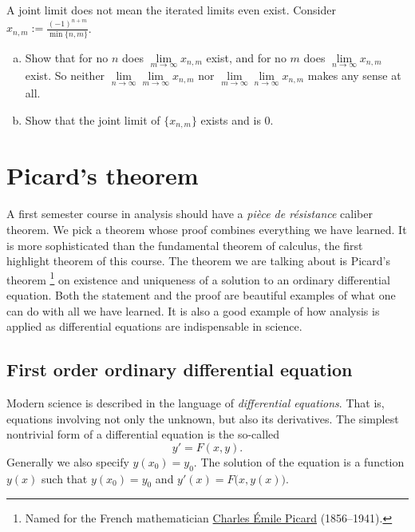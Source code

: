 \documentclass[12pt]{book}
\begin{document}
\begin{exercise}
A joint limit does not mean the iterated limits even exist.
Consider $x_{n,m} := \frac{{(-1)}^{n+m}}{\min \{n,m \}}$.
\begin{enumerate}[a)]
 \item Show that for no $n$ does
$\lim\limits_{m \to \infty} x_{n,m}$ exist, and for no $m$
does 
$\lim\limits_{n \to \infty} x_{n,m}$ exist.
So neither
$\lim\limits_{n\to\infty}\lim\limits_{m \to \infty} x_{n,m}$ nor
$\lim\limits_{m\to\infty}\lim\limits_{n \to \infty} x_{n,m}$ makes any sense
at all.
 \item Show that the joint limit of $\{ x_{n,m} \}$ exists and is 0.
\end{enumerate}
\end{exercise}


\sectionnewpage
\section{Picard's theorem}
\label{sec:picard}


A first semester course in analysis should have
a \emph{pi\`ece de r\'esistance} caliber
theorem.
We pick a theorem whose proof combines everything we have
learned.
It is more sophisticated than the fundamental theorem of calculus,
the first highlight theorem of this course.
The
theorem we are talking about is Picard's
theorem%
\footnote{Named for the French mathematician
\href{http://en.wikipedia.org/wiki/\%C3\%89mile_Picard}{Charles \'Emile Picard}
(1856--1941).}
on existence and uniqueness of a solution to an ordinary differential equation.
Both the statement and the proof are beautiful examples of what one can do
with all we have learned.
It is also a good example of how analysis is
applied as differential equations are indispensable in science.

\subsection*{First order ordinary differential equation}

Modern science is described in the language of
\emph{differential equations}.
That is, equations involving not only the unknown, but also its
derivatives.
The simplest nontrivial form of a differential equation is
the so-called \emph{}
\begin{equation*}
y' = F(x,y) .
\end{equation*}
Generally we also specify $y(x_0)=y_0$.
The solution of
the equation is a function $y(x)$ such that 
$y(x_0)=y_0$ and $y'(x) = F\bigl(x,y(x)\bigr)$.
\end{document}
